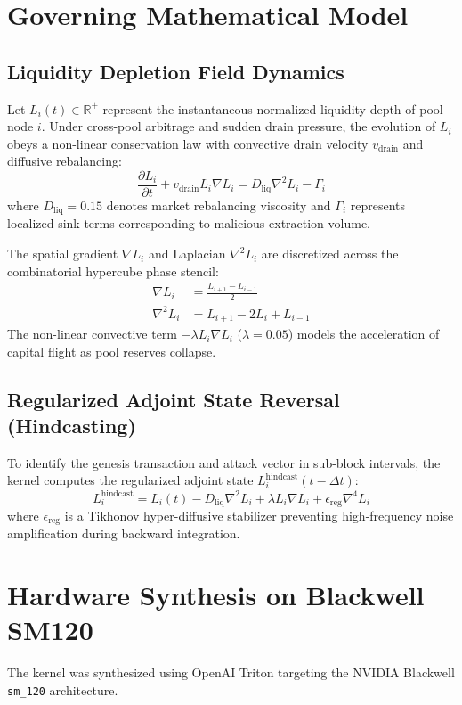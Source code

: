 \documentclass[10pt,twocolumn]{article}
\begin{document}
\section{Governing Mathematical Model}

\subsection{Liquidity Depletion Field Dynamics}
Let $L_i(t) \in \mathbb{R}^+$ represent the instantaneous normalized liquidity depth of pool node $i$. Under cross-pool arbitrage and sudden drain pressure, the evolution of $L_i$ obeys a non-linear conservation law with convective drain velocity $v_{\text{drain}}$ and diffusive rebalancing:
\begin{equation}
\frac{\partial L_i}{\partial t} + v_{\text{drain}} L_i \nabla L_i = D_{\text{liq}} \nabla^2 L_i - \Gamma_i
\end{equation}
where $D_{\text{liq}} = 0.15$ denotes market rebalancing viscosity and $\Gamma_i$ represents localized sink terms corresponding to malicious extraction volume. 

The spatial gradient $\nabla L_i$ and Laplacian $\nabla^2 L_i$ are discretized across the combinatorial hypercube phase stencil:
\begin{align}
\nabla L_i &= \frac{L_{i+1} - L_{i-1}}{2} \\
\nabla^2 L_i &= L_{i+1} - 2L_i + L_{i-1}
\end{align}
The non-linear convective term $-\lambda L_i \nabla L_i$ ($\lambda = 0.05$) models the acceleration of capital flight as pool reserves collapse.

\subsection{Regularized Adjoint State Reversal (Hindcasting)}
To identify the genesis transaction and attack vector in sub-block intervals, the kernel computes the regularized adjoint state $L_i^{\text{hindcast}}(t - \Delta t)$:
\begin{equation}
L_i^{\text{hindcast}} = L_i(t) - D_{\text{liq}} \nabla^2 L_i + \lambda L_i \nabla L_i + \epsilon_{\text{reg}} \nabla^4 L_i
\end{equation}
where $\epsilon_{\text{reg}}$ is a Tikhonov hyper-diffusive stabilizer preventing high-frequency noise amplification during backward integration.

\section{Hardware Synthesis on Blackwell SM120}
The kernel was synthesized using OpenAI Triton targeting the NVIDIA Blackwell \texttt{sm\_120} architecture.
\end{document}
